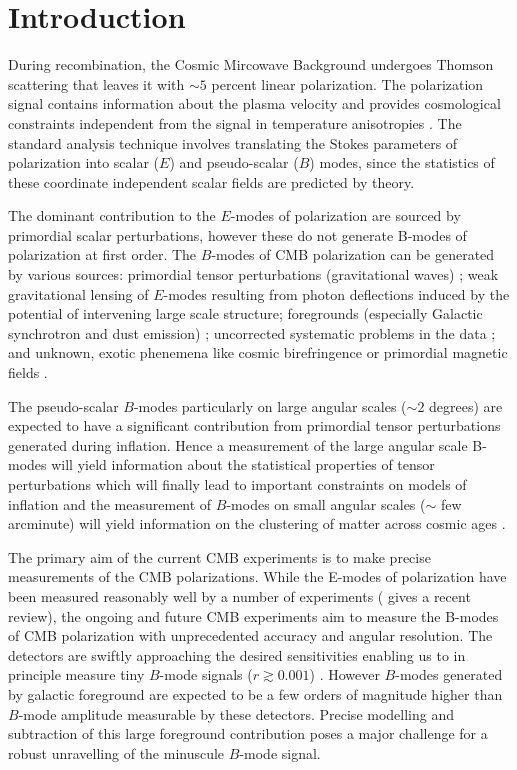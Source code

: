 \section{Introduction}
During recombination, the Cosmic Mircowave Background undergoes Thomson scattering that leaves it with $\sim 5$ percent linear polarization.  The polarization signal contains information about the plasma velocity and provides cosmological constraints independent from the signal in temperature anisotropies \citep{1997NewA....2..323H}.  The standard analysis technique involves translating the Stokes parameters of polarization into scalar ($E$) and pseudo-scalar ($B$) modes, since the statistics of these coordinate independent scalar fields are predicted by theory.   

The dominant contribution to the $E$-modes of polarization are sourced by primordial scalar perturbations, however these do not generate B-modes of polarization at first order. The $B$-modes of CMB polarization can be generated by various sources:
primordial tensor perturbations (gravitational waves)%
\citep{1997PhRvD..56..596H,1997PhRvL..78.2054S};
weak gravitational lensing of $E$-modes resulting from photon deflections induced by the potential of intervening large scale structure;
foregrounds (especially Galactic synchrotron and dust emission)
\citep{2016A&A...586A.133P};
uncorrected systematic problems in the data \citep{2003PhRvD..67d3004H,2008PhRvD..77h3003S};
and unknown, exotic phenemena like cosmic birefringence or primordial magnetic fields
\citep{1996ApJ...469....1K,1999PhRvL..83.1506L,2004ApJ...616....1C,2014MNRAS.438.2508P}.

The pseudo-scalar $B$-modes particularly on large angular scales ($\sim 2$ degrees) are expected to have a significant contribution from primordial tensor perturbations generated during inflation. Hence a measurement of the large angular scale B-modes will yield information about the statistical properties of tensor perturbations which will finally lead to important constraints on models of inflation and the measurement of $B$-modes on small angular scales ($\sim$ few arcminute) will yield information on the clustering of matter across cosmic ages \citep{Abazajian2015, Kamionkowski2016,Abazajian2016,Hu2002c,Wehus2016}.
  
The primary aim of the current CMB experiments is to make precise measurements of the CMB polarizations. While the E-modes of polarization have been measured reasonably well by a number of experiments (\cite{2018RPPh...81d4901S} gives a recent review), the ongoing and future CMB experiments aim to measure the B-modes of CMB polarization with unprecedented accuracy and angular resolution. The detectors are swiftly approaching the desired sensitivities enabling us to in principle measure tiny $B$-mode signals ($r\gtrsim 0.001$) \cite{s4 science book, pico mission study}. However $B$-modes generated by galactic foreground are expected to be a few orders of magnitude higher than $B$-mode amplitude measurable by these detectors.  Precise modelling and subtraction of this large foreground contribution poses a major challenge for a robust unravelling of the minuscule $B$-mode signal. 
 
